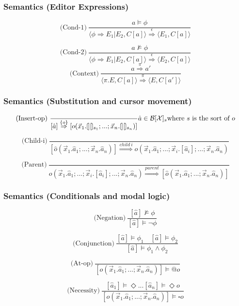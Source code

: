 \documentclass[t,24pt,aspectratio=169]{beamer}
\newcommand{\cleftsemicirc}{\put(3.5,2.5){\oval(5,10)[l]}\put(3.5,-2.5){\line(0,0){10}}\phantom{\circ}}
\newcommand{\crightsemicirc}{\put(1.5,2.5){\oval(5,10)[r]}\put(1.5,-2.5){\line(0,0){10}}\phantom{\circ}}
\newcommand{\hole}{\cleftsemicirc \crightsemicirc}
\begin{document}
\begin{frame}
    \frametitle{Semantics (Editor Expressions)}

    \[
        \text{(Cond-1)} \ \frac{a \models \phi}{\langle \phi \Rightarrow E_1|E_2, C[a] \rangle \stackrel{\epsilon}{\Rightarrow} \langle E_1, C[a] \rangle}
    \]

    \[
        \text{(Cond-2)} \ \frac{a \not\models \phi}{\langle \phi \Rightarrow E_1|E_2, C[a] \rangle \stackrel{\epsilon}{\Rightarrow} \langle E_2, C[a] \rangle}
    \]
    \[
        \text{(Context)} \ \frac{a \stackrel{\pi}{\Rightarrow} a'}{\langle \pi.E,C[a] \rangle \stackrel{\pi}{\Rightarrow} \langle E,C[a'] \rangle}
    \]
\end{frame}

\begin{frame}
    \frametitle{Semantics (Substitution and cursor movement)}
    \[
        \text{(Insert-op)} \ \frac{}{[\hat{a}] \stackrel{\{ o \}}{\Rightarrow} [o(\vec{x}_1.\hole_{s_1};...;\vec{x}_n.\hole_{s_n})]} \hat{a} \in \mathcal{B}[\mathcal{X}]_s \text{where } s \text{ is the sort of } o
    \]

    \vspace{1cm}

    \[
        \text{(Child-i)} \ \frac{}{[\hat{o}(\vec{x}_1.\hat{a}_1;...;\vec{x}_n.\hat{a}_n)] \stackrel{child \ i}{\Rightarrow} o(\vec{x}_1.\hat{a}_1;...;\vec{x}_i.[\hat{a}_i];...;\vec{x}_n.\hat{a}_n)}
    \]

    \[
        \text{(Parent)} \ \frac{}{o(\vec{x}_1.\hat{a}_1;...;\vec{x}_i.[\hat{a}_i];...;\vec{x}_n.\hat{a}_n) \stackrel{parent}{\Rightarrow} [\hat{o}(\vec{x}_1.\hat{a}_1;...;\vec{x}_n.\hat{a}_n)]}
    \]
\end{frame}

\begin{frame}
    \frametitle{Semantics (Conditionals and modal logic)}
    \[
        \text{(Negation)} \ \frac{[\hat{a}] \not\models \phi}{[\hat{a}] \models \neg \phi}
    \]

    \[
        \text{(Conjunction)} \ \frac{[\hat{a}] \models \phi_1 \quad [\hat{a}] \models \phi_2}{[\hat{a}] \models \phi_1 \land \phi_2}
    \]

    \vspace{0.3cm}

    \[
        \text{(At-op)} \ \frac{}{[o(\vec{x}_1.\hat{a}_1;...;\vec{x}_n.\hat{a}_n)] \models @o}
    \]

    \[
        \text{(Necessity)} \ \frac{[\hat{a}_1] \models \Diamond ... [\hat{a}_n] \models \Diamond o}{[o(\vec{x}_1.\hat{a}_1;...;\vec{x}_n.\hat{a}_n)] \models \square o}
    \]

\end{frame}
\end{document}
